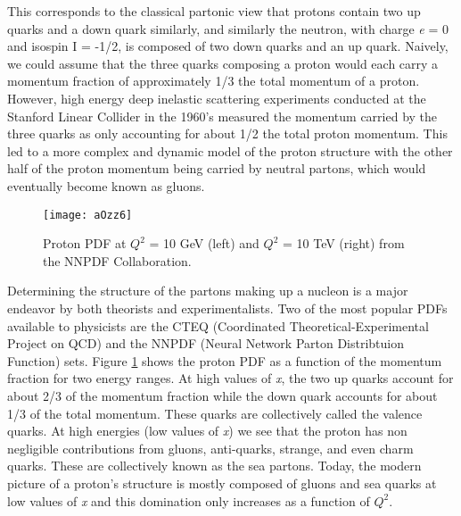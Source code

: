 \noindent
This corresponds to the classical partonic view that protons contain two up quarks and a down quark similarly, and similarly the neutron, with charge \textit{e} = 0 and isospin I = -1/2, is composed of two down quarks and an up quark.  Naively, we could assume that the three quarks composing a proton would each carry a momentum fraction of approximately 1/3 the total momentum of a proton.  However, high energy deep inelastic scattering experiments conducted at the Stanford Linear Collider in the 1960's\cite{Panofsky:871460} measured the momentum carried by the three quarks as only accounting for about 1/2 the total proton momentum.  This led to a more complex and dynamic model of the proton structure with the other half of the proton momentum being carried by neutral partons, which would eventually become known as gluons.

\begin{figure}[h]
\texttt{[image: aOzz6]}
\centering
\caption{Proton PDF at $Q^{2}$ = 10 GeV (left) and  $Q^{2}$ = 10 TeV (right) from the NNPDF Collaboration\cite{Feltesse:2010}.}
\label{fig:PDFNNPDF}
\end{figure}

Determining the structure of the partons making up a nucleon is a major endeavor by both theorists and experimentalists.  Two of the most popular PDFs available to physicists are the CTEQ\cite{Kovarik:2013sya} (Coordinated Theoretical-Experimental Project on QCD) and the NNPDF\cite{Ball:1966481} (Neural Network Parton Distribtuion Function) sets.  Figure \ref{fig:PDFNNPDF} shows the proton PDF as a function of the momentum fraction for two energy ranges.  At high values of \textit{x}, the two up quarks account for about 2/3 of the momentum fraction while the down quark accounts for about 1/3 of the total momentum.  These quarks are collectively called the valence quarks.  At high energies (low values of \textit{x}) we see that the proton has non negligible contributions from gluons, anti-quarks, strange, and even charm quarks.  These are collectively known as the sea partons.  Today, the modern picture of a proton's structure is mostly composed of gluons and sea quarks at low values of \textit{x} and this domination only increases as a function of $Q^{2}$\cite{Fritzsch:1992mu}.

